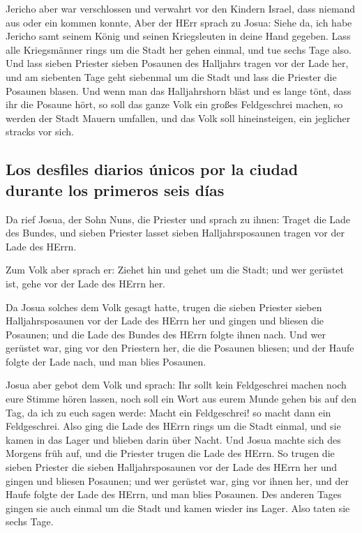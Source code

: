  Jericho aber war verschlossen und verwahrt vor den
Kindern Israel, dass niemand aus oder ein kommen konnte, 
Aber der HErr sprach zu Josua: Siehe da, ich habe Jericho samt seinem
König und seinen Kriegsleuten in deine Hand gegeben.  Lass
alle Kriegsmänner rings um die Stadt her gehen einmal, und tue sechs
Tage also.  Und lass sieben Priester sieben Posaunen des
Halljahrs tragen vor der Lade her, und am siebenten Tage geht siebenmal
um die Stadt und lass die Priester die Posaunen blasen. 
Und wenn man das Halljahrshorn bläst und es lange tönt, dass ihr die
Posaune hört, so soll das ganze Volk ein großes Feldgeschrei machen, so
werden der Stadt Mauern umfallen, und das Volk soll hineinsteigen, ein
jeglicher stracks vor sich.

\hypertarget{los-desfiles-diarios-uxfanicos-por-la-ciudad-durante-los-primeros-seis-duxedas}{%
\subsection{Los desfiles diarios únicos por la ciudad durante los
primeros seis
días}\label{los-desfiles-diarios-uxfanicos-por-la-ciudad-durante-los-primeros-seis-duxedas}}

 Da rief Josua, der Sohn Nuns, die Priester und sprach zu
ihnen: Traget die Lade des Bundes, und sieben Priester lasset sieben
Halljahrsposaunen tragen vor der Lade des HErrn.

 Zum Volk aber sprach er: Ziehet hin und gehet um die
Stadt; und wer gerüstet ist, gehe vor der Lade des HErrn her.

 Da Josua solches dem Volk gesagt hatte, trugen die sieben
Priester sieben Halljahrsposaunen vor der Lade des HErrn her und gingen
und bliesen die Posaunen; und die Lade des Bundes des HErrn folgte ihnen
nach.  Und wer gerüstet war, ging vor den Priestern her,
die die Posaunen bliesen; und der Haufe folgte der Lade nach, und man
blies Posaunen.

 Josua aber gebot dem Volk und sprach: Ihr sollt kein
Feldgeschrei machen noch eure Stimme hören lassen, noch soll ein Wort
aus eurem Munde gehen bis auf den Tag, da ich zu euch sagen werde: Macht
ein Feldgeschrei! so macht dann ein Feldgeschrei.  Also
ging die Lade des HErrn rings um die Stadt einmal, und sie kamen in das
Lager und blieben darin über Nacht.  Und Josua machte
sich des Morgens früh auf, und die Priester trugen die Lade des HErrn.
 So trugen die sieben Priester die sieben
Halljahrsposaunen vor der Lade des HErrn her und gingen und bliesen
Posaunen; und wer gerüstet war, ging vor ihnen her, und der Haufe folgte
der Lade des HErrn, und man blies Posaunen.  Des anderen
Tages gingen sie auch einmal um die Stadt und kamen wieder ins Lager.
Also taten sie sechs Tage.

